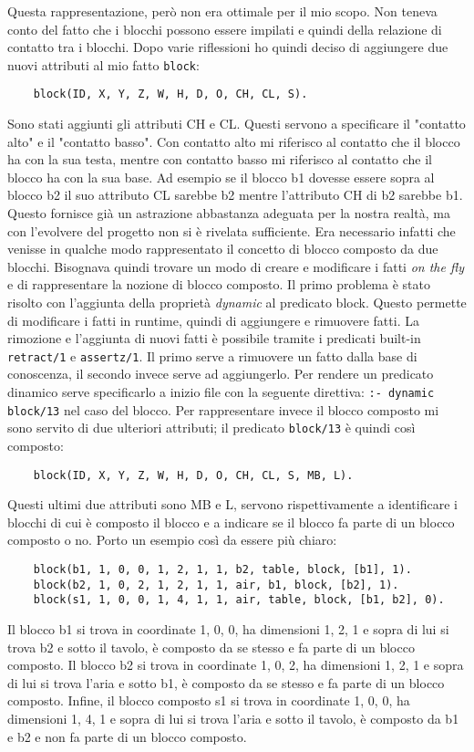 Questa rappresentazione, però non era ottimale per il mio scopo. Non teneva conto del fatto che i blocchi possono essere impilati e quindi della relazione di contatto tra i blocchi. Dopo varie riflessioni ho quindi deciso di aggiungere due nuovi attributi al mio fatto \verb+block+:
\begin{verbatim}
    block(ID, X, Y, Z, W, H, D, O, CH, CL, S).
\end{verbatim}
Sono stati aggiunti gli attributi CH e CL. Questi servono a specificare il "contatto alto" e il "contatto basso". Con contatto alto mi riferisco al contatto che il blocco ha con la sua testa, mentre con contatto basso mi riferisco al contatto che il blocco ha con la sua base. Ad esempio se il blocco b1 dovesse essere sopra al blocco b2 il suo attributo CL sarebbe b2 mentre l'attributo CH di b2 sarebbe b1. Questo fornisce già un astrazione abbastanza adeguata per la nostra realtà, ma con l'evolvere del progetto non si è rivelata sufficiente.
Era necessario infatti che venisse in qualche modo rappresentato il concetto di blocco composto da due blocchi. Bisognava quindi trovare un modo di creare e modificare i fatti \textit{on the fly} e di rappresentare la nozione di blocco composto.
Il primo problema è stato risolto con l'aggiunta della proprietà \textit{dynamic} al predicato block. Questo permette di modificare i fatti in runtime, quindi di aggiungere e rimuovere fatti. La rimozione e l'aggiunta di nuovi fatti è possibile tramite i predicati built-in \verb+retract/1+ e \verb+assertz/1+. Il primo serve a rimuovere un fatto dalla base di conoscenza, il secondo invece serve ad aggiungerlo.
Per rendere un predicato dinamico serve specificarlo a inizio file con la seguente direttiva: \verb+:- dynamic block/13+ nel caso del blocco.
Per rappresentare invece il blocco composto mi sono servito di due ulteriori attributi; il predicato \verb+block/13+ è quindi così composto:
\begin{verbatim}
    block(ID, X, Y, Z, W, H, D, O, CH, CL, S, MB, L).
\end{verbatim}
Questi ultimi due attributi sono MB e L, servono rispettivamente a identificare i blocchi di cui è composto il blocco e a indicare se il blocco fa parte di un blocco composto o no. Porto un esempio così da essere più chiaro:
\begin{verbatim}
    block(b1, 1, 0, 0, 1, 2, 1, 1, b2, table, block, [b1], 1).
    block(b2, 1, 0, 2, 1, 2, 1, 1, air, b1, block, [b2], 1).
    block(s1, 1, 0, 0, 1, 4, 1, 1, air, table, block, [b1, b2], 0).
\end{verbatim}
Il blocco b1 si trova in coordinate 1, 0, 0, ha dimensioni 1, 2, 1 e sopra di lui si trova b2 e sotto il tavolo, è composto da se stesso e fa parte di un blocco composto.
Il blocco b2 si trova in coordinate 1, 0, 2, ha dimensioni 1, 2, 1 e sopra di lui si trova l'aria e sotto b1, è composto da se stesso e fa parte di un blocco composto.
Infine, il blocco composto s1 si trova in coordinate 1, 0, 0, ha dimensioni 1, 4, 1 e sopra di lui si trova l'aria e sotto il tavolo, è composto da b1 e b2 e non fa parte di un blocco composto.

